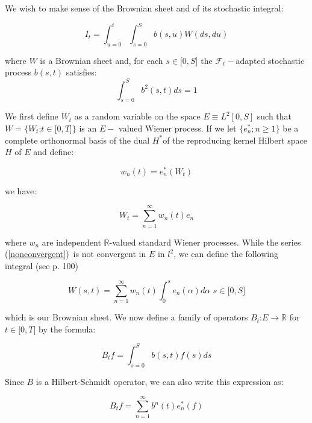 \documentclass{article}
\begin{document}
\bigskip

We wish to make sense of the Brownian sheet and of its stochastic integral:

\begin{equation}
I_{t}=\int_{u=0}^{t}\int_{s=0}^{S}b(s,u)W(ds,du)  \label{continuous}
\end{equation}%
\bigskip

where $W$ is a Brownian sheet and, for each $s\in \lbrack 0,S]$ the $%
\mathcal{F}_{t}-$adapted stochastic process $b(s,t)$ satisfies:%
\begin{equation*}
\int_{s=0}^{S}b^{2}(s,t)ds=1
\end{equation*}

We first define $W_{t}$ as a random variable on the space $E\equiv
L^{2}[0,S] $ such that $W=\{W_{t}$;$t\in \lbrack 0,T]\}$ is an $E-$ valued
Wiener process. If we let $\{e_{n}^{\ast };n\geq 1\}$ be a complete
orthonormal basis of the dual $H^{\ast }$of the reproducing kernel Hilbert
space $H$ of $E$ and define:

\begin{equation*}
w_{n}(t)=e_{n}^{\ast }(W_{t})
\end{equation*}

we have:

\begin{equation}
W_{t}=\sum_{n=1}^{\infty }w_{n}(t)e_{n}  \label{nonconvergent}
\end{equation}

where $w_{n}$ are independent $\mathbb{R}$-valued standard Wiener processes.
While the series (\ref{nonconvergent})\ is not convergent in $E$ in $l^{2}$,
we can define the following integral (see \cite{DPZ92} p. 100)

\begin{equation*}
W(s,t)=\sum_{n=1}^{\infty }w_{n}(t)\int_{0}^{s}e_{n}(\alpha )d\alpha \text{
\ \ }s\in \lbrack 0,S]
\end{equation*}

which is our Brownian sheet. We now define a family of operators $B_{t}$:$%
E\rightarrow \mathbb{R}$ for $t\in \lbrack 0,T]$ by the formula:

\begin{equation*}
B_{t}f=\int_{s=0}^{S}b(s,t)f(s)ds
\end{equation*}

Since $B$ is a Hilbert-Schmidt operator, we can also write this expression
as:

\begin{equation*}
B_{t}f=\sum_{n=1}^{\infty }b^{n}(t)e_{n}^{\ast }(f)
\end{equation*}
\end{document}
